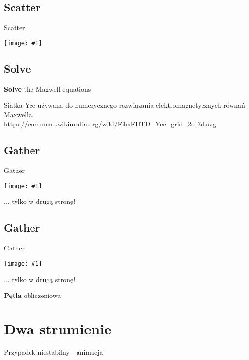 \documentclass{beamer}
\newcommand {\graphic}[1] {
        \begin{center}
            \texttt{[image: \#1]}
        \end{center}
}
\begin{document}
        \subsection{Scatter}
        \begin{frame}[t]{Scatter}
          \graphic{img/shapefunctions-eps-converted-to.pdf}
        \end{frame}

        \subsection{Solve}
        \begin{frame}[t]{\textbf{Solve} the Maxwell equations}
          
          {Siatka Yee używana do numerycznego rozwiązania elektromagnetycznych równań Maxwella. \\
          \url{https://commons.wikimedia.org/wiki/File:FDTD_Yee_grid_2d-3d.svg}}
        \end{frame}

        \subsection{Gather}
        \begin{frame}[t]{Gather}
          \graphic{img/shapefunctions-eps-converted-to.pdf}
          ... tylko w drugą stronę!
        \end{frame}

        \subsection{Gather}
        \begin{frame}[t]{Gather}
          \graphic{img/shapefunctions-eps-converted-to.pdf}
          ... tylko w drugą stronę!
        \end{frame}

        \begin{frame}[t]{\textbf{Pętla} obliczeniowa}
          
        \end{frame}

    \section{Dwa strumienie}

        \begin{frame}[t]{Przypadek niestabilny - animacja}

        \end{frame}
\end{document}
